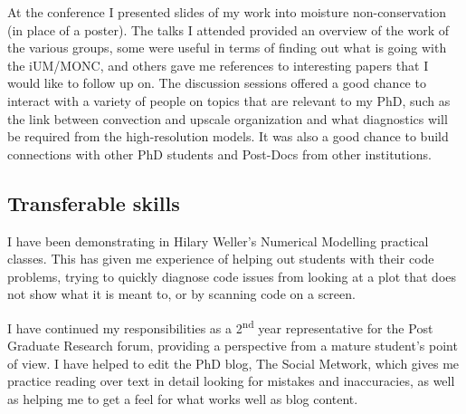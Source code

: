 \documentclass[11pt,a4paper]{article}
\newcommand{\ts}{\textsuperscript}
\begin{document}
At the conference I presented slides of my work into moisture non-conservation (in place of a poster). The talks I attended provided an overview of the work of the various groups, some were useful in terms of finding out what is going with the iUM/MONC, and others gave me references to interesting papers that I would like to follow up on. The discussion sessions offered a good chance to interact with a variety of people on topics that are relevant to my PhD, such as the link between convection and upscale organization and what diagnostics will be required from the high-resolution models. It was also a good chance to build connections with other PhD students and Post-Docs from other institutions.


\label{sec:Training record}
\subsection{Transferable skills}
I have been demonstrating in Hilary Weller's Numerical Modelling practical classes. This has given me experience of helping out students with their code problems, trying to quickly diagnose code issues from looking at a plot that does not show what it is meant to, or by scanning code on a screen. %

I have continued my responsibilities as a 2\ts{nd} year representative for the Post Graduate Research forum, providing a perspective from a mature student's point of view. I have helped to edit the PhD blog, The Social Metwork, which gives me practice reading over text in detail looking for mistakes and inaccuracies, as well as helping me to get a feel for what works well as blog content. 
\end{document}
